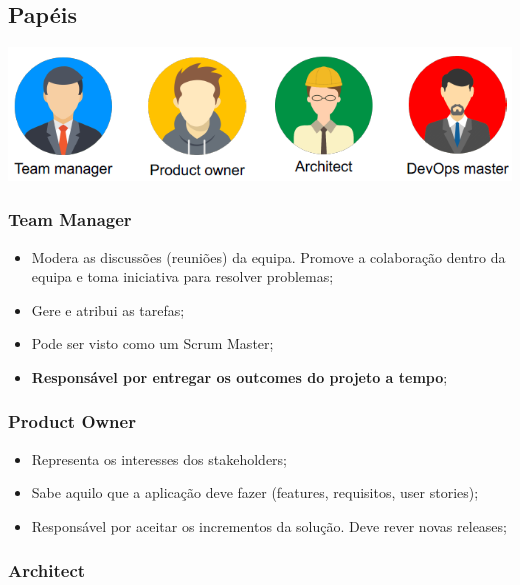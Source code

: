 \documentclass{article}
\begin{document}
\subsection{Papéis}

\begin{center}
  \includegraphics[scale=0.6]{46}
\end{center}

\pagebreak

\subsubsection{Team Manager}

\begin{itemize}
  \item Modera as discussões (reuniões) da equipa. Promove a colaboração
  dentro da equipa e toma iniciativa para resolver problemas;
  \item Gere e atribui as tarefas;
  \item Pode ser visto como um Scrum Master;
  \item \textbf{Responsável por entregar os outcomes do projeto a tempo};
\end{itemize}

\subsubsection{Product Owner}

\begin{itemize}
  \item Representa os interesses dos stakeholders;
  \item Sabe aquilo que a aplicação deve fazer (features, requisitos, user stories);
  \item Responsável por aceitar os incrementos da solução. Deve rever novas releases;
\end{itemize}

\subsubsection{Architect}
\end{document}
